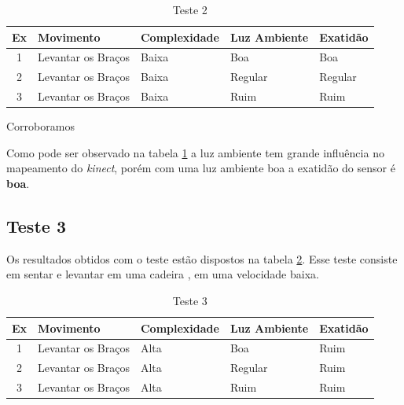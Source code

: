 \begin{table}[H]
\centering
\caption{Teste 2}
\label{tab:teste2}
\begin{tabular}{@{}|c|c|l|l|l|@{}}
\toprule
\multicolumn{1}{|l|}{\textbf{Ex}} & \multicolumn{1}{l|}{\textbf{Movimento}} & \textbf{Complexidade} & \textbf{Luz Ambiente} & \textbf{Exatidão} \\ \midrule
1                                 & Levantar os  Braços                     & Baixa                 & Boa                   & Boa               \\ \midrule
2                                 & Levantar os  Braços                     & Baixa                 & Regular               & Regular           \\ \midrule
3                                 & Levantar os  Braços                     & Baixa                 & Ruim                  & Ruim              \\ \bottomrule
\end{tabular}
\end{table}Corroboramos

Como pode ser observado na tabela \ref{tab:teste2} a luz ambiente tem grande influência no mapeamento do \textit{kinect}, porém com uma luz ambiente boa
a exatidão do sensor é \textbf{boa}.

\subsection{Teste 3}\label{sub:teste3}
Os resultados obtidos com o teste estão dispostos na tabela \ref{tab:teste3}. Esse teste consiste em sentar e levantar em uma cadeira , em uma velocidade
baixa.


\begin{table}[H]
\centering
\caption{Teste 3}
\label{tab:teste3}
\begin{tabular}{@{}|c|c|l|l|l|@{}}
\toprule
\multicolumn{1}{|l|}{\textbf{Ex}} & \multicolumn{1}{l|}{\textbf{Movimento}} & \textbf{Complexidade} & \textbf{Luz Ambiente} & \textbf{Exatidão} \\ \midrule
1                                 & Levantar os  Braços                     & Alta                 & Boa                   & Ruim               \\ \midrule
2                                 & Levantar os  Braços                     & Alta                 & Regular               & Ruim           \\ \midrule
3                                 & Levantar os  Braços                     & Alta                 & Ruim                  & Ruim              \\ \bottomrule
\end{tabular}
\end{table}

